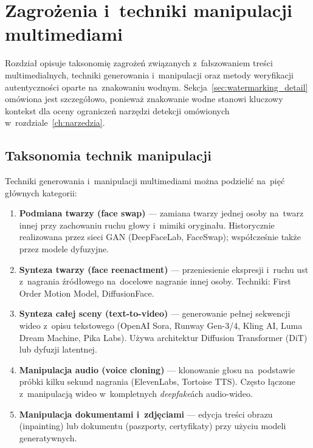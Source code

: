 \chapter{Zagro\.{z}enia i~techniki manipulacji multimediami}
\label{ch:zagrozenia}

Rozdzia\l{} opisuje taksonomi\k{e} zagro\.{z}e\'{n} zwi\k{a}zanych
z~fa\l{}szowaniem tre\'{s}ci multimedialnych, techniki generowania
i~manipulacji oraz metody weryfikacji autentyczno\'{s}ci oparte
na~znakowaniu wodnym. Sekcja~\ref{sec:watermarking_detail}
om\'{o}wiona jest szczeg\'{o}\l{}owo, poniewa\.{z} znakowanie wodne stanowi
kluczowy kontekst dla oceny ogranicze\'{n} narz\k{e}dzi detekcji
om\'{o}wionych w~rozdziale~\ref{ch:narzedzia}.

\section{Taksonomia technik manipulacji}
\label{sec:taksonomia}

Techniki generowania i~manipulacji multimediami mo\.{z}na podzieli\'{c}
na~pi\k{e}\'{c} g\l{}\'{o}wnych kategorii:

\begin{enumerate}
  \item \textbf{Podmiana twarzy (face swap)} ---
        zamiana twarzy jednej osoby na~twarz innej przy
        zachowaniu ruchu g\l{}owy i~mimiki orygina\l{}u.
        Historycznie realizowana przez sieci GAN
        (DeepFaceLab, FaceSwap); wsp\'{o}\l{}cze\'{s}nie
        tak\.{z}e przez modele dyfuzyjne.

  \item \textbf{Synteza twarzy (face reenactment)} ---
        przeniesienie ekspresji i~ruchu ust z~nagrania
        \'{z}r\'{o}d\l{}owego na~docelowe nagranie innej osoby.
        Techniki: First Order Motion Model, DiffusionFace.

  \item \textbf{Synteza ca\l{}ej sceny (text-to-video)} ---
        generowanie pe\l{}nej sekwencji wideo z~opisu
        tekstowego (OpenAI Sora, Runway Gen-3/4, Kling AI,
        Luma Dream Machine, Pika Labs).
        U\.{z}ywa architektur Diffusion Transformer (DiT)
        lub dyfuzji latentnej.

  \item \textbf{Manipulacja audio (voice cloning)} ---
        klonowanie g\l{}osu na~podstawie pr\'{o}bki kilku sekund
        nagrania (ElevenLabs, Tortoise TTS).
        Cz\k{e}sto \l{}\k{a}czone z~manipulacj\k{a} wideo
        w~kompletnych \textit{deepfake}\'{a}ch audio-wideo.

  \item \textbf{Manipulacja dokumentami i~zdj\k{e}ciami} ---
        edycja tre\'{s}ci obrazu (inpainting) lub dokumentu
        (paszporty, certyfikaty) przy u\.{z}yciu modeli
        generatywnych.
\end{enumerate}

